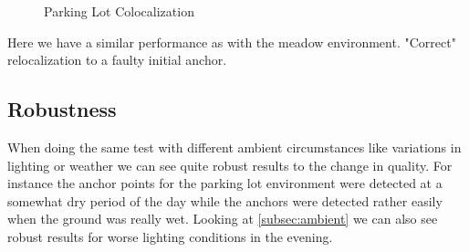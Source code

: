 \begin{figure}[htp]
    \centering
        \hfill
        \hfill
    \caption{Parking Lot Colocalization}
    \label{fig:parking_lot_basic}
\end{figure}

Here we have a similar performance as with the meadow environment. "Correct" relocalization to a faulty initial anchor. 

\subsection*{Robustness}\label{subsec:robustness}

When doing the same test with different ambient circumstances like variations in lighting or weather we can see quite robust results to the change in quality. For instance the anchor points for the parking lot environment were detected at a somewhat dry period of the day while the anchors were detected rather easily when the ground was really wet. Looking at \cref{subsec:ambient} we can also see robust results for worse lighting conditions in the evening.

